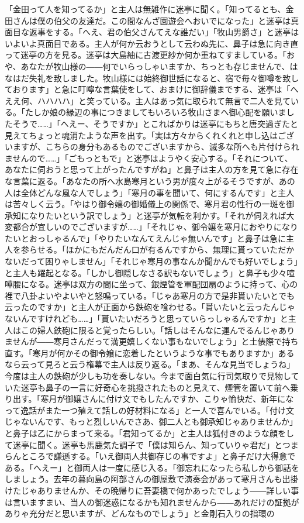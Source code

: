 \documentclass[12pt, openright]{book}
\begin{document}
「金田って人を知ってるか」と主人は無雑作に迷亭に聞く。「知ってるとも、金田さんは僕の伯父の友達だ。この間なんざ園遊会へおいでになった」と迷亭は真面目な返事をする。「へえ、君の伯父さんてえな誰だい」「牧山男爵さ」と迷亭はいよいよ真面目である。主人が何か云おうとして云わぬ先に、鼻子は急に向き直って迷亭の方を見る。迷亭は大島紬に古渡更紗か何か重ねてすましている。「おや、あなたが牧山様の――何でいらっしゃいますか、ちっとも存じませんで、はなはだ失礼を致しました。牧山様には始終御世話になると、宿で毎々御噂を致しております」と急に叮嚀な言葉使をして、おまけに御辞儀までする、迷亭は「へええ何、ハハハハ」と笑っている。主人はあっ気に取られて無言で二人を見ている。「たしか娘の縁辺の事につきましてもいろいろ牧山さまへ御心配を願いましたそうで\ldots{}\ldots{}」「へえー、そうですか」とこればかりは迷亭にもちと唐突過ぎたと見えてちょっと魂消たような声を出す。「実は方々からくれくれと申し込はございますが、こちらの身分もあるものでございますから、滅多な所へも片付けられませんので\ldots{}\ldots{}」「ごもっともで」と迷亭はようやく安心する。「それについて、あなたに伺おうと思って上がったんですがね」と鼻子は主人の方を見て急に存在な言葉に返る。「あなたの所へ水島寒月という男が度々上がるそうですが、あの人は全体どんな風な人でしょう」「寒月の事を聞いて、何にするんです」と主人は苦々しく云う。「やはり御令嬢の御婚儀上の関係で、寒月君の性行の一斑を御承知になりたいという訳でしょう」と迷亭が気転を利かす。「それが伺えれば大変都合が宜しいのでございますが\ldots{}\ldots{}」「それじゃ、御令嬢を寒月におやりになりたいとおっしゃるんで」「やりたいなんてえんじゃ無いんです」と鼻子は急に主人を参らせる。「ほかにもだんだん口が有るんですから、無理に貰っていただかないだって困りゃしません」「それじゃ寒月の事なんか聞かんでも好いでしょう」と主人も躍起となる。「しかし御隠しなさる訳もないでしょう」と鼻子も少々喧嘩腰になる。迷亭は双方の間に坐って、銀煙管を軍配団扇のように持って、心の裡で八卦よいやよいやと怒鳴っている。「じゃあ寒月の方で是非貰いたいとでも云ったのですか」と主人が正面から鉄砲を喰わせる。「貰いたいと云ったんじゃないんですけれども\ldots{}\ldots{}」「貰いたいだろうと思っていらっしゃるんですか」と主人はこの婦人鉄砲に限ると覚ったらしい。「話しはそんなに運んでるんじゃありませんが――寒月さんだって満更嬉しくない事もないでしょう」と土俵際で持ち直す。「寒月が何かその御令嬢に恋着したというような事でもありますか」あるなら云って見ろと云う権幕で主人は反り返る。「まあ、そんな見当でしょうね」今度は主人の鉄砲が少しも功を奏しない。今まで面白気に行司気取りで見物していた迷亭も鼻子の一言に好奇心を挑撥されたものと見えて、煙管を置いて前へ乗り出す。「寒月が御嬢さんに付け文でもしたんですか、こりゃ愉快だ、新年になって逸話がまた一つ殖えて話しの好材料になる」と一人で喜んでいる。「付け文じゃないんです、もっと烈しいんでさあ、御二人とも御承知じゃありませんか」と鼻子は乙にからまって来る。「君知ってるか」と主人は狐付きのような顔をして迷亭に聞く。迷亭も馬鹿気た調子で「僕は知らん、知っていりゃ君だ」とつまらんところで謙遜する。「いえ御両人共御存じの事ですよ」と鼻子だけ大得意である。「へえー」と御両人は一度に感じ入る。「御忘れになったら私しから御話をしましょう。去年の暮向島の阿部さんの御屋敷で演奏会があって寒月さんも出掛けたじゃありませんか、その晩帰りに吾妻橋で何かあったでしょう――詳しい事は言いますまい、当人の御迷惑になるかも知れませんから――あれだけの証拠がありゃ充分だと思いますが、どんなものでしょう」と金剛石入りの指環の
\end{document}
